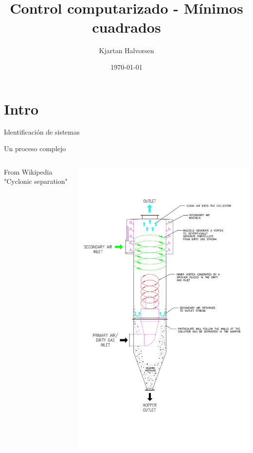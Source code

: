 \documentclass[presentation,aspectratio=169]{beamer}
\author{Kjartan Halvorsen}
\date{\today}
\title{Control computarizado - Mínimos cuadrados}
\begin{document}
\maketitle

\section{Intro}
\label{sec:orgb256e81}
\begin{frame}[label={sec:orge43e146}]{Identificación de sistemas}
\end{frame}

\begin{frame}[label={sec:org7bdf691}]{Un proceso complejo}
\begin{columns}
\begin{column}{0.6\columnwidth}
From Wikipedia "Cyclonic separation"
\end{column}
\begin{column}{0.4\columnwidth}
\begin{center}
\includegraphics[height=1.0\textheight]{../../figures/Vertical-cyclone.jpg}
\end{center}
\end{column}
\end{columns}
\end{frame}
\end{document}
